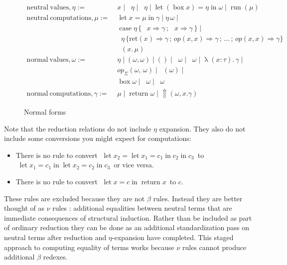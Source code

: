 \documentclass[acmsmall, screen, nonacm]{acmart}
\theoremstyle{definition}
\newcommand{\reflectname}{\Uparrow}
\newcommand{\performraw}[2]{\mathop{\reflectname(#1(#2))}}
\newcommand{\perform}[5]{\performraw{#1}{#2}(#3, #4. #5)}
\newcommand{\reifyname}{\Downarrow}
\newcommand{\reifyraw}[1]{\mathop{\reifyname_{#1}}}
\newcommand{\reify}[3]{\reifyraw{#1}(#2.\,#3)}
\newcommand{\outlname}{\mathrm{out}_L}
\newcommand{\outl}[1]{\mathop{\outlname} #1}
\newcommand{\outrname}{\mathrm{out}_R}
\newcommand{\outr}[1]{\mathop{\outrname} #1}
\newcommand{\indintro}[4]{#2_{#1}(#3,\, #4)}
\newcommand{\retname}{\mathrm{ret}}
\newcommand{\ret}[2]{\mathop{\retname_{#1}}(#2)}
\newcommand{\indelim}[3]{\mathop{\mathrm{rec}_{#1}} #2 \,\{#3\}}
\newcommand{\indretcase}[2]{\retname(#1) \Rightarrow #2}
\newcommand{\indcase}[4]{#1(#2, #3) \Rightarrow #4}
\newcommand{\seq}{\,;\,}
\newcommand{\fst}{\mathop{\pi_1}}
\newcommand{\snd}{\mathop{\pi_2}}
\newcommand{\inl}[1]{\mathop{\mathrm{in}_L} #1}
\newcommand{\inr}[1]{\mathop{\mathrm{in}_R} #1}
\newcommand{\case}[5]{\mathop{\mathrm{case}} #1 \,\{\,\inl{#2} \Rightarrow #3 \seq \inr{#4} \Rightarrow #5 \,\}}
\newcommand{\abs}[3]{\mathop{\lambda}(#1 \types #2).\,#3}
\newcommand{\app}[2]{#1\,#2}
\newcommand{\types}{\mathrel{:}}
\newcommand{\return}[1]{\mathop{\mathrm{return}} #1}
\newcommand{\letv}[3]{\mathop{\mathrm{let}} #1 = #2 \mathop{\mathrm{in}} #3}
\newcommand{\gbox}[1]{\mathop{\mathrm{box}} #1}
\newcommand{\gunbox}[3]{\mathop{\mathrm{let}} (\gbox #1) = #2 \mathop{\mathrm{in}} #3}
\newcommand{\grun}[1]{\mathop{\mathrm{run}}(#1)}
\begin{document}
\begin{figure}
\begin{align*}
  \mathrm{neutral\ values}, \eta :=\;& x \mid \fst \eta \mid \snd \eta
                                     \mid \gunbox{x}{\eta}{\omega} \mid \grun{\mu} \\
  \mathrm{neutral\ computations}, \mu :=\;& \letv{x}{\mu}{\gamma}
                                           \mid \app{\eta}{\omega} \mid \\
                                   & \case{\eta}{x}{\gamma}{x}{\gamma} \mid \\
                            & \indelim{\Sigma}{\eta}
                              {\indretcase{x}{\gamma} \seq
                               \indcase{op}{x}{x}{\gamma} \seq \ldots \seq
                               \indcase{op}{x}{x}{\gamma}} \\
                                   & \reify{\Sigma}{x}{\mu} \\
  \mathrm{normal\ values}, \omega :=\;& \eta \mid (\omega, \omega)
                           \mid () \mid \inl{\omega} \mid \inr{\omega} \mid \abs{x}{\tau}{\gamma} \mid \\
                           &\indintro{\Sigma}{op}{\omega}{\omega} \mid \ret{\Sigma}{\omega} \mid \\
                           &\gbox{\omega} \mid \outl{\omega} \mid \outr{\omega} \\
  \mathrm{normal\ computations}, \gamma :=\;& \mu \mid \return{\omega}
                                               \mid \perform{\eta}{op}{\omega}{x}{\gamma}
\end{align*}
\caption{Normal forms}
\label{fig:normal}
\end{figure}

Note that the reduction relations do not include $\eta$ expansion. They
also do not include some conversions you might expect for computations:
\begin{itemize}
\item There is no rule to convert
  $\; \letv{x_2}{\letv{x_1}{c_1}{c_2}}{c_3} \,$ to
  $\; \letv{x_1}{c_1}{\letv{x_2}{c_2}{c_3}} \,$ or vice versa.
\item There is no rule to convert $\; \letv{x}{c}{\return x} \,$ to $c$.
\end{itemize}
These rules are excluded because they are not $\beta$ rules. Instead
they are better thought of as $\nu$ rules \cite{allais2013new}:
additional equalities between neutral terms that are immediate
consequences of structural induction. Rather than be included as part of
ordinary reduction they can be done as an additional standardization
pass on neutral terms after reduction and $\eta$-expansion have
completed. This staged approach to computing equality of terms works
because $\nu$ rules cannot produce additional $\beta$ redexes.
\end{document}
